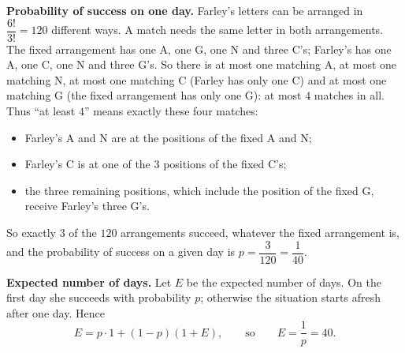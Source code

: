 \textbf{Probability of success on one day.} Farley's letters can be arranged in $\dfrac{6!}{3!}=120$ different ways. A match needs the same letter in both arrangements. The fixed arrangement has one A, one G, one N and three C's; Farley's has one A, one C, one N and three G's. So there is at most one matching A, at most one matching N, at most one matching C (Farley has only one C) and at most one matching G (the fixed arrangement has only one G): at most $4$ matches in all. Thus ``at least $4$'' means exactly these four matches:
\begin{itemize}
\item Farley's A and N are at the positions of the fixed A and N;
\item Farley's C is at one of the $3$ positions of the fixed C's;
\item the three remaining positions, which include the position of the fixed G, receive Farley's three G's.
\end{itemize}
So exactly $3$ of the $120$ arrangements succeed, whatever the fixed arrangement is, and the probability of success on a given day is $p=\dfrac{3}{120}=\dfrac1{40}$.

\textbf{Expected number of days.} Let $E$ be the expected number of days. On the first day she succeeds with probability $p$; otherwise the situation starts afresh after one day. Hence
\[E=p\cdot1+(1-p)(1+E),\qquad\text{so}\qquad E=\dfrac1p=\boxed{40}.\]
